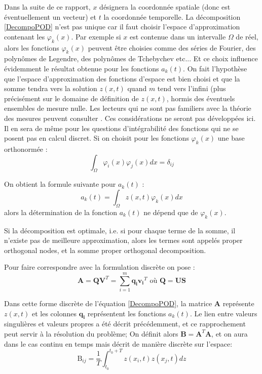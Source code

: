 \documentclass[12pt,a4paper]{report}
\begin{document}
Dans la suite de ce rapport, $x$ désignera la coordonnée spatiale (donc est éventuellement un vecteur) et $t$ la coordonnée temporelle. La décomposition \ref{DecompoPOD} n'est pas unique car il faut choisir l'espace d'approximation contenant les $\varphi_k(x)$. Par exemple si $x$ est contenue dans un intervalle $\Omega$ de réel, alors les fonctions $\varphi_k(x)$ peuvent être choisies comme des séries de Fourier, des polynômes de Legendre, des polynômes de Tchebychev etc... Et ce choix influence évidemment le résultat obtenue pour les fonctions $a_k(t)$. On fait l'hypothèse que l'espace d'approximation des fonctions d'espace est bien choisi et que la somme tendra vers la solution $z(x,t)$ quand $m$ tend vers l'infini (plus précisément sur le domaine de définition de $z(x,t)$, hormis des éventuels ensembles de mesure nulle. Les lecteurs qui ne sont pas familiers avec la théorie des mesures peuvent consulter \cite{Analysis}. Ces considérations ne seront pas développées ici. Il en sera de même pour les questions d'intégrabilité des fonctions qui ne se posent pas en calcul discret. Si on choisit pour les fonctions $\varphi_k(x)$ une base orthonormée :
\begin{equation}
\int_\Omega \varphi_i(x) \varphi_j(x) dx = \delta_{ij}
\end{equation}

\noindent
On obtient la formule suivante pour $a_k(t)$ :
\begin{equation}
	a_k(t) = \int_\Omega z(x,t) \varphi_k(x) dx 
\end{equation}
alors la détermination de la fonction $a_k(t)$ ne dépend que de $\varphi_k(x)$.

Si la décomposition est optimale, i.e. si pour chaque terme de la somme, il n'existe pas de meilleure approximation, alors les termes sont appelés proper orthogonal nodes, et la somme proper orthogonal decomposition.

\noindent
Pour faire correspondre avec la formulation discrète on pose :
\begin{equation}
	\mathbf{A} 	= \mathbf{Q} \mathbf{V}^T 
				= \sum_{i=1}^m \mathbf{q_i} \mathbf{v_i}^T
		\text{ où } \mathbf{Q} = \mathbf{U}\mathbf{S}
\end{equation}

Dans cette forme discrète de l'équation \ref{DecompoPOD}, la matrice $\mathbf{A}$ représente $z(x,t)$ et les colonnes $\mathbf{q_i}$ représentent les fonctions $a_k(t)$. 
Le lien entre valeurs singulières et valeurs propres a été décrit précédemment, et ce rapprochement peut servir à la résolution du problème; On définit alors $\mathbf{B} = \mathbf{A}^T \mathbf{A}$, et on aura dans le cas continu en temps mais décrit de manière discrète sur l'espace:
\begin{equation}
	\text{B}_{ij} = \frac{1}{T} 
			\int_{t_0}^{t_0+T} z(x_i,t) z(x_j,t)dz
\end{equation}
\end{document}
